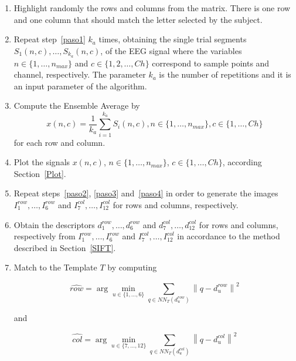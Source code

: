 \documentclass[utf8]{frontiersSCNS} %
\begin{document}
\begin{enumerate}
\item \label{paso1}Highlight randomly the rows and columns from the matrix.  There is one row and one column that should match the letter selected by the subject.
\item  \label{paso2} Repeat step~\ref{paso1} $k_a$ times, obtaining the single trial segments $S_1(n,c),\dots,S_{k_a}(n,c)$, of the EEG signal where the variables $n \in \{1, \dots, n_{max}\}$ and $c \in \{1,2,\dots,Ch\}$ correspond to sample points and channel, respectively. The parameter $k_a$ is the number of repetitions and it is an input parameter of the algorithm.
\item \label{paso3} Compute the Ensemble Average by
\begin{equation}
x(n,c)= \frac{1}{k_a}\sum_{i=1}^{k_a}S_i(n,c),n \in \{1, \dots, n_{max}\}, c \in \{1,\dots,Ch\}
\label{averaging}
\end{equation}  
for each row and column. 

\item \label{paso4}Plot the signals $x(n,c)$,  $n \in \{1, \dots, n_{max}\}$, $c \in \{1,\dots,Ch\}$,  according Section~\ref{Plot}. 

\item Repeat steps~\ref{paso2}, \ref{paso3} and~\ref{paso4} in order to generate the images $I^{row}_1, \dots, I^{row}_6$ and $I^{col}_7,\dots,I^{col}_{12}$ for rows and columns, respectively. 

\item Obtain the descriptors $ d^{row}_1, \dots,  d^{row}_6 $  and  $ d^{col}_7, \dots,  d^{col}_{12} $ for rows and columns, respectively from $I^{row}_1, \dots, I^{row}_6$ and $I^{col}_7,\dots,I^{col}_{12}$  in accordance to the method described in Section~\ref{SIFT}. 

\item Match to the Template $T$ by computing  

\begin{equation}
\hat{row} = \arg \min_{u \in \{1,\dots,6\}} \sum_{q \in NN_T(d^{row}_u)}^{} \left\lVert q -  d^{row}_u \right\rVert ^2
\label{eq:multiclassificationrow}
\end{equation}

\noindent and

\begin{equation}
\hat{col} = \arg \min_{u \in \{7,\dots,12\}} \sum_{q \in NN_T(d^{col}_u)}^{} \left\lVert q -  d^{col}_u \right\rVert ^2
\label{eq:multiclassificationcol}
\end{equation}


\end{enumerate}
\end{document}
